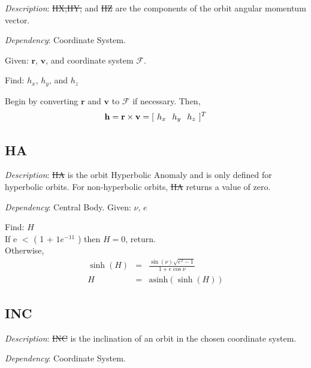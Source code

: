\noindent \textit{Description}: \st{HX,HY,} and \st{HZ} are the
components of the orbit angular momentum vector.

\noindent \textit{Dependency}:  Coordinate System.

\noindent Given:  $\mathbf{r}$, $\mathbf{v}$, and coordinate system
$\mathcal{F}$.

\noindent Find:  $h_x$, $h_y$, and $h_z$

Begin by converting $\mathbf{r}$ and $\mathbf{v}$ to $\mathcal{F}$
if necessary. Then,
%
\begin{equation}
    \mathbf{h} = \mathbf{r} \times \mathbf{v} = [\hspace{.05 in} h_x
    \hspace{.1 in} h_y \hspace{.1 in} h_z \hspace{.05 in} ]^T
\end{equation}


\subsection{HA}  \label{sec:HyperbolicAnomaly}

\noindent \textit{Description}: \st{HA} is the orbit Hyperbolic
Anomaly and is only defined for hyperbolic orbits.  For
non-hyperbolic orbits, \st{HA} returns a value of zero.

\noindent \textit{Dependency}:  Central Body.
 Given: $\nu$, $e$

\noindent Find:  $H$\\
%

\noindent If e $<$ ( 1 + $1e^{-11}$ ) then $H = 0$, return.\\
%


\noindent Otherwise,
%
\begin{eqnarray}
    \sinh(H) & = & \frac{ \sin(\nu) \sqrt{e^2 - 1}}{1+e \cos{\nu}}    \\    %
    H & = & \mbox{asinh}(\sinh(H))
\end{eqnarray}
%

\subsection{INC} 

\noindent \textit{Description}: \st{INC} is the inclination of an
orbit in the chosen coordinate system.

\noindent \textit{Dependency}:  Coordinate System.

